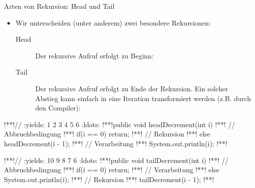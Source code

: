 \begin{frame}[fragile]{Arten von Rekursion: Head und Tail}
    \begin{itemize}[<+(1)->]
        \widei
        \item Wir unterscheiden (unter anderem) zwei besondere Rekursionen: \begin{description}
            \item[Head] Der rekursive Aufruf erfolgt zu Beginn: 
            \item[Tail] Der rekursive Aufruf erfolgt zu Ende der Rekursion.\pause{} Ein solcher Abstieg kann einfach in eine Iteration transformiert werden (z.B. durch den Compiler): 
        \end{description}
    \end{itemize}
\begin{center}\scriptsize%
\begin{minipage}{.45\linewidth}
\begin{plainjava}
!**!// :yields: 1 2 3 4 5 6 :ldots:
!**!public void headDecrement(int i){
!**!    // Abbruchbedingung
!**!    if(i == 0) return;
!**!    // Rekursion
!**!    else headDecrement(i - 1);
!**!    // Verarbeitung
!**!    System.out.println(i);
!**!}
\end{plainjava}
\end{minipage}\qquad\begin{minipage}{.45\linewidth}
\begin{plainjava}
!**!// :yields: 10 9 8 7 6 :ldots:
!**!public void tailDecrement(int i){
!**!    // Abbruchbedingung
!**!    if(i == 0) return;
!**!    // Verarbeitung
!**!    else System.out.println(i);
!**!    // Rekursion
!**!    tailDecrement(i - 1);
!**!}
\end{plainjava}
\end{minipage}
\end{center}
\end{frame}

